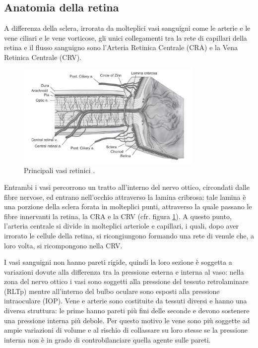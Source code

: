 \documentclass{article}
\begin{document}
\subsection{Anatomia della retina}
A differenza della sclera, irrorata da molteplici vasi sanguigni come le arterie e le vene ciliari e le vene vorticose, gli unici collegamenti tra la rete di capillari della retina e il flusso sanguigno sono l'Arteria Retinica Centrale (CRA) e la Vena Retinica Centrale (CRV).
\begin{figure}[h]
\begin{center}
\includegraphics[width=0.8\textwidth]{Pictures/Optic_nerve.png}
\caption{Principali vasi retinici \cite{Tesi}.}
\label{retina}
\end{center}
\end{figure}
Entrambi i vasi percorrono un tratto all'interno del nervo ottico, circondati dalle fibre nervose, ed entrano nell'occhio attraverso la lamina cribrosa: tale lamina è una porzione della sclera forata in molteplici punti, attraverso la quale passano le fibre innervanti la retina, la CRA e la CRV (cfr. figura \ref{retina}).
A questo punto, l'arteria centrale si divide in molteplici arteriole e capillari, i quali, dopo aver irrorato le cellule della retina, si ricongiungono formando una rete di venule che, a loro volta, si ricompongono nella CRV.

I vasi sanguigni non hanno pareti rigide, quindi la loro sezione è soggetta a variazioni dovute alla differenza tra la pressione esterna e interna al vaso: nella zona del nervo ottico i vasi sono soggetti alla pressione del tessuto retrolaminare (RLTp) mentre all'interno del bulbo oculare sono esposti alla pressione intraoculare (IOP).
Vene e arterie sono costituite da tessuti diversi e hanno una diversa struttura: le prime hanno pareti più fini delle seconde e devono sostenere una pressione interna più debole.
Per questo motivo le vene sono più soggette ad ampie variazioni di volume e al rischio di collassare su loro stesse se la pressione interna non è in grado di controbilanciare quella agente sulle pareti.
\end{document}

